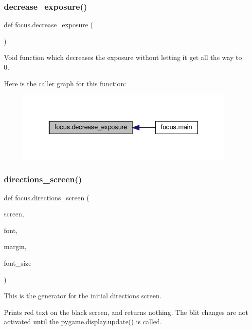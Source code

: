 \subsubsection{\texorpdfstring{decrease\+\_\+exposure()}{decrease\_exposure()}}
{\footnotesize\ttfamily def focus.\+decrease\+\_\+exposure (\begin{DoxyParamCaption}{ }\end{DoxyParamCaption})}



Void function which decreases the exposure without letting it get all the way to 0. 

Here is the caller graph for this function\+:\nopagebreak
\begin{figure}[H]
\begin{center}
\leavevmode
\includegraphics[width=309pt]{namespacefocus_a8fb78b10ef91e414ac6707d45fcd0e5b_icgraph}
\end{center}
\end{figure}
\mbox{\label{namespacefocus_a7c48f36dcbc8deec93ed615925469176}} 
\subsubsection{\texorpdfstring{directions\+\_\+screen()}{directions\_screen()}}
{\footnotesize\ttfamily def focus.\+directions\+\_\+screen (\begin{DoxyParamCaption}\item[{}]{screen,  }\item[{}]{font,  }\item[{}]{margin,  }\item[{}]{font\+\_\+size }\end{DoxyParamCaption})}



This is the generator for the initial directions screen. 

Prints red text on the black screen, and returns nothing. The blit changes are not activated until the pygame.\+display.\+update() is called.


